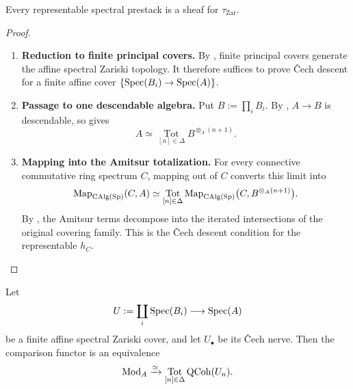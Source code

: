 \begin{theorem}
\label{thm:spectral-zariski-subcanonical}
Every representable spectral prestack is a sheaf for
\(\tau_{\mathrm{Zar}}\).
\end{theorem}

\begin{proof}
\leavevmode
\begin{enumerate}[label=\textup{(\arabic*)}]
    \item \textbf{Reduction to finite principal covers.}
    By , finite principal covers generate
    the affine spectral Zariski topology. It therefore suffices to prove
    \v{C}ech descent for a finite affine cover
    \(\{\operatorname{Spec}(B_i)\to\operatorname{Spec}(A)\}\).

    \item \textbf{Passage to one descendable algebra.}
    Put \(B:=\prod_iB_i\). By
    , \(A\to B\) is descendable,
    so  gives
    \[
        A
        \simeq
        \operatorname*{Tot}_{[n]\in\Delta}
        B^{\otimes_A(n+1)}.
    \]

    \item \textbf{Mapping into the Amitsur totalization.}
    For every connective commutative ring spectrum \(C\), mapping out of
    \(C\) converts this limit into
    \[
        \operatorname{Map}_{\operatorname{CAlg}(\operatorname{Sp})}(C,A)
        \simeq
        \operatorname*{Tot}_{[n]\in\Delta}
        \operatorname{Map}_{\operatorname{CAlg}(\operatorname{Sp})}
        \bigl(C,B^{\otimes_A(n+1)}\bigr).
    \]
    By , the Amitsur terms decompose into
    the iterated intersections of the original covering family. This is the
    \v{C}ech descent condition for the representable \(h_C\).
\end{enumerate}
\end{proof}

\begin{theorem}
\label{thm:affine-qcoh-zariski-descent}
Let
\[
    U:=\coprod_i\operatorname{Spec}(B_i)
    \longrightarrow
    \operatorname{Spec}(A)
\]
be a finite affine spectral Zariski cover, and let $U_\bullet$ be its
\v{C}ech nerve. Then the comparison functor is an equivalence
\[
    \operatorname{Mod}_A
    \xrightarrow{\simeq}
    \operatorname*{Tot}_{[n]\in\Delta}
    \operatorname{QCoh}(U_n).
\]
\end{theorem}

